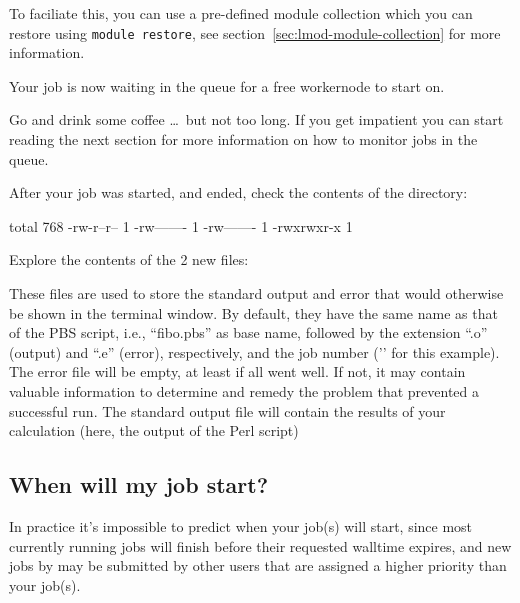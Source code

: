 \ifusinglmod
To faciliate this, you can use a pre-defined module collection which you can restore using \lstinline|module restore|,
see section~\ref{sec:lmod-module-collection} for more information.
\fi

Your job is now waiting in the queue for a free workernode to start on.

Go and drink some coffee \dots\ but not too long. If you get impatient you can
start reading the next section for more information on how to monitor jobs in the queue.

After your job was started, and ended, check the contents of the directory:

\begin{prompt}
total 768
-rw-r--r-- 1 %
-rw------- 1 %
-rw------- 1 %
-rwxrwxr-x 1 %
\end{prompt}

Explore the contents of the 2 new files:

\begin{prompt}
\end{prompt}

These files are used to store the standard output and error that would
otherwise be shown in the terminal window. By default, they have the same name
as that of the PBS script, i.e., ``fibo.pbs'' as base name, followed by the
extension ``.o'' (output) and ``.e'' (error), respectively, and the job number
('\jobnumber' for this example). The error file will be empty, at least if all went
well. If not, it may contain valuable information to determine and remedy the
problem that prevented a successful run. The standard output file will contain
the results of your calculation (here, the output of the Perl script)

\ifgent
\subsection{When will my job start?}
\label{subsec:priority}
In practice it's impossible to predict when your job(s) will start,
since most currently running jobs will finish before their requested walltime
expires, and new jobs by may be submitted by other users that are assigned a higher
priority than your job(s).

